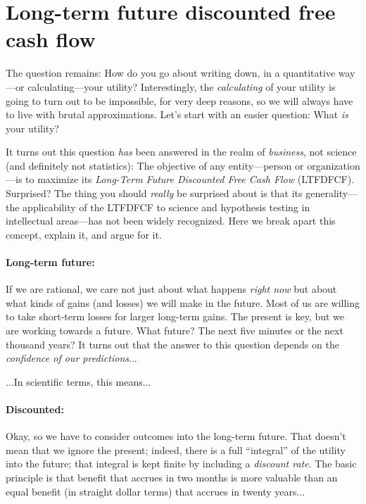 \documentclass[12pt,twoside,pdftex]{article}
\begin{document}
\section{Long-term future discounted free cash flow}

The question remains: How do you go about writing down, in a
quantitative way---or calculating---your utility?  Interestingly, the
\emph{calculating} of your utility is going to turn out to be
impossible, for very deep reasons, so we will always have to live with
brutal approximations.  Let's start with an easier question: What
\emph{is} your utility?

It turns out this question \emph{has} been
answered in the realm of \emph{business},
not science (and definitely not statistics):
The objective of any entity---person or organization---is to maximize
its \emph{Long-Term Future Discounted Free Cash Flow} (LTFDFCF).
Surprised?  The thing you should \emph{really} be surprised about is
that its generality---the applicability of the LTFDFCF to science and
hypothesis testing in intellectual areas---has not been widely
recognized.  Here we break apart this concept, explain it, and argue
for it.

\paragraph{Long-term future:}
If we are rational, we care not just about what happens \emph{right
now} but about what kinds of gains (and losses) we will make in the
future.  Most of us are willing to take short-term losses for larger
long-term gains.  The present is key, but we are working towards a
future.  What future?  The next five minutes or the next thousand
years?  It turns out that the answer to this question depends on the
\emph{confidence of our predictions}...

...In scientific terms, this means...

\paragraph{Discounted:}
Okay, so we have to consider outcomes into the long-term future.  That
doesn't mean that we ignore the present; indeed, there is a full
``integral'' of the utility into the future; that integral is kept
finite by including a \emph{discount rate}.  The basic principle is
that benefit that accrues in two months is more valuable than an equal
benefit (in straight dollar terms) that accrues in twenty years...
\end{document}
